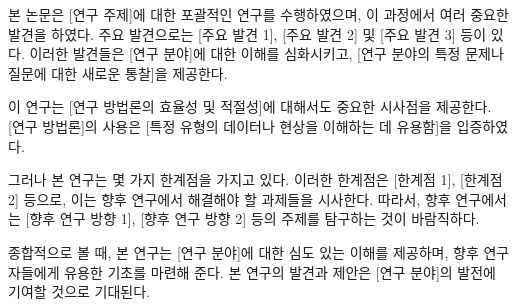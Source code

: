 본 논문은 [연구 주제]에 대한 포괄적인 연구를 수행하였으며, 이 과정에서 여러 중요한 발견을 하였다. 
주요 발견으로는 [주요 발견 1], [주요 발견 2] 및 [주요 발견 3] 등이 있다. 
이러한 발견들은 [연구 분야]에 대한 이해를 심화시키고, [연구 분야의 특정 문제나 질문에 대한 새로운 통찰]을 제공한다.

이 연구는 [연구 방법론의 효율성 및 적절성]에 대해서도 중요한 시사점을 제공한다. 
[연구 방법론]의 사용은 [특정 유형의 데이터나 현상을 이해하는 데 유용함]을 입증하였다.

그러나 본 연구는 몇 가지 한계점을 가지고 있다.
이러한 한계점은 [한계점 1], [한계점 2] 등으로, 이는 향후 연구에서 해결해야 할 과제들을 시사한다. 
따라서, 향후 연구에서는 [향후 연구 방향 1], [향후 연구 방향 2] 등의 주제를 탐구하는 것이 바람직하다.

종합적으로 볼 때, 본 연구는 [연구 분야]에 대한 심도 있는 이해를 제공하며, 향후 연구자들에게 유용한 기초를 마련해 준다. 
본 연구의 발견과 제안은 [연구 분야]의 발전에 기여할 것으로 기대된다.

